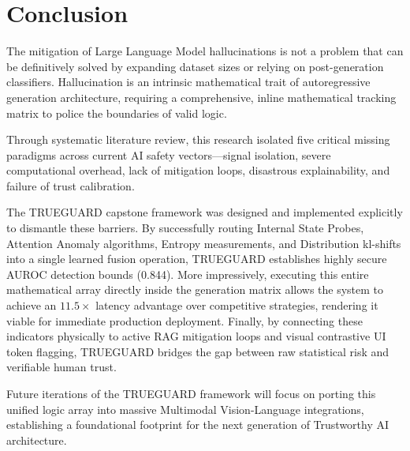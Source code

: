 \documentclass{article}
\begin{document}
\section{Conclusion}
\label{sec:conclusion}

The mitigation of Large Language Model hallucinations is not a problem that can be definitively solved by expanding dataset sizes or relying on post-generation classifiers. Hallucination is an intrinsic mathematical trait of autoregressive generation architecture, requiring a comprehensive, inline mathematical tracking matrix to police the boundaries of valid logic.

Through systematic literature review, this research isolated five critical missing paradigms across current AI safety vectors—signal isolation, severe computational overhead, lack of mitigation loops, disastrous explainability, and failure of trust calibration. 

The TRUEGUARD capstone framework was designed and implemented explicitly to dismantle these barriers. By successfully routing Internal State Probes, Attention Anomaly algorithms, Entropy measurements, and Distribution kl-shifts into a single learned fusion operation, TRUEGUARD establishes highly secure AUROC detection bounds (0.844). More impressively, executing this entire mathematical array directly inside the generation matrix allows the system to achieve an $11.5\times$ latency advantage over competitive strategies, rendering it viable for immediate production deployment. Finally, by connecting these indicators physically to active RAG mitigation loops and visual contrastive UI token flagging, TRUEGUARD bridges the gap between raw statistical risk and verifiable human trust. 

Future iterations of the TRUEGUARD framework will focus on porting this unified logic array into massive Multimodal Vision-Language integrations, establishing a foundational footprint for the next generation of Trustworthy AI architecture.
\end{document}
